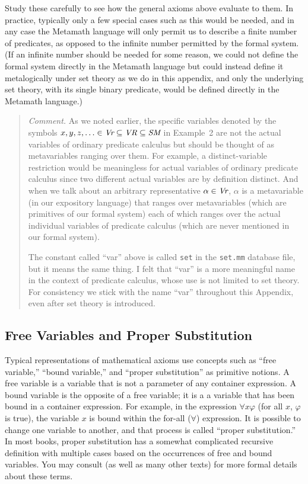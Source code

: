 Study these carefully to see how the general axioms above evaluate to
them.  In practice, typically only a few special cases such as this would be
needed, and in any case the Metamath language will only permit us to describe
a finite number of predicates, as opposed to the infinite number permitted by
the formal system.  (If an infinite number should be needed for some reason,
we could not define the formal system directly in the Metamath language but
could instead define it metalogically under set theory as we
do in this appendix, and only the underlying set theory, with its single
binary predicate, would be defined directly in the Metamath language.)


{\footnotesize\begin{quotation}
{\em Comment.}  As we noted earlier, the specific variables denoted by the
symbols $x,y,z,\ldots\in \mbox{\em Vr}\subseteq \mbox{\em VR}\subseteq
\mbox{\em SM}$ in Example~2 are not the actual variables of ordinary predicate
calculus but should be thought of as metavariables ranging over them.  For
example, a distinct-variable restriction would be meaningless for actual
variables of ordinary predicate calculus since two different actual variables
are by definition distinct.  And when we talk about an arbitrary
representative $\alpha\in \mbox{\em Vr}$, $\alpha$ is a metavariable (in our
expository language) that ranges over metavariables (which are primitives of
our formal system) each of which ranges over the actual individual variables
of predicate calculus (which are never mentioned in our formal system).

The constant called ``var'' above is called \texttt{set} in the
\texttt{set.mm} database file, but it means the same thing.  I felt
that ``var'' is a more meaningful name in the context of predicate
calculus, whose use is not limited to set theory.  For consistency we
stick with the name ``var'' throughout this Appendix, even after set
theory is introduced.
\end{quotation}}

\subsection{Free Variables and Proper Substitution}

Typical representations of mathematical axioms use concepts such
as ``free variable,'' ``bound variable,'' and ``proper substitution''
as primitive notions.
A free variable is a variable that
is not a parameter of any container expression.
A bound variable is the opposite of a free variable; it is a
a variable that has been bound in a container expression.
For example, in the expression $\forall x \varphi$ (for all $x$, $\varphi$
is true), the variable $x$
is bound within the for-all ($\forall$) expression.
It is possible to change one variable to another, and that process is called
``proper substitution.''
In most books, proper substitution has a somewhat complicated recursive
definition with multiple cases based on the occurrences of free and
bound variables.
You may consult
\cite[ch.\ 3--4]{Hamilton} (as well as
many other texts) for more formal details about these terms.

